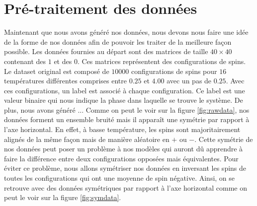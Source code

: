 \documentclass[11pt]{scrartcl} %
\begin{document}
\section{Pré-traitement des données}
Maintenant que nous avons généré nos données, nous devons nous faire une idée de la forme de nos données afin de pouvoir les traiter de la meilleure façon possible.
Les données fournies au départ sont des matrices de taille $40 \times 40$ contenant des $1$ et des $0$. Ces matrices représentent des configurations de spins. Le dataset original est composé de $10000$ configurations de spins pour $16$ températures différentes comprises entre $0.25$ et $4.00$ avec un pas de $0.25$.
Avec ces configurations, un label est associé à chaque configuration. Ce label est une valeur binaire qui nous indique la phase dans laquelle se trouve le système. 
De plus, nous avons généré ...
Comme on peut le voir sur la figure \ref{fig:rawdata}, nos données forment un ensemble bruité mais il apparaît une symétrie par rapport à l'axe horizontal. En effet, à basse température, les spins sont majoritairement alignés de la même façon mais de manière aléatoire en $+$ ou $-$.
Cette symétrie de nos données peut poser un problème à nos modèles qui auront dû apprendre à faire la différence entre deux configurations opposées mais équivalentes. Pour éviter ce problème, nous allons symétriser nos données en inversant les spins de toutes les configurations qui ont une moyenne de spin  négative. 
Ainsi, on se retrouve avec des données symétriques par rapport à l'axe horizontal comme on peut le voir sur la figure \ref{fig:symdata}.
\end{document}
